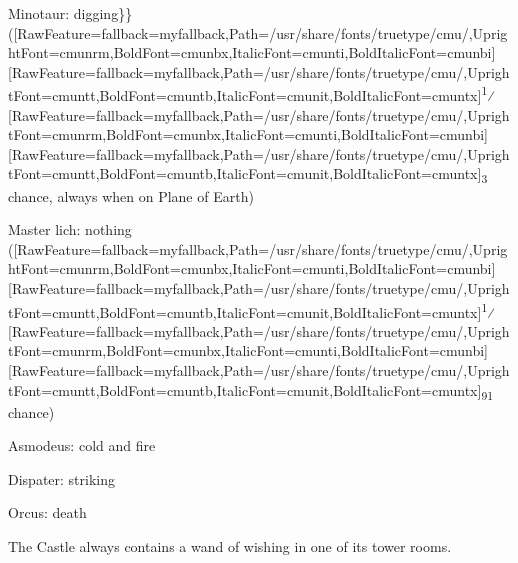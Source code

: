 \begin{myitemize}
\item{}Minotaur\footnotemark[67]: digging\}\} (\allowbreak{}\setmainfont{cmunrm.ttf}[RawFeature={fallback=myfallback},Path=/usr/share/fonts/truetype/cmu/,UprightFont=cmunrm,BoldFont=cmunbx,ItalicFont=cmunti,BoldItalicFont=cmunbi]\setmonofont{cmunrm.ttf}[RawFeature={fallback=myfallback},Path=/usr/share/fonts/truetype/cmu/,UprightFont=cmuntt,BoldFont=cmuntb,ItalicFont=cmunit,BoldItalicFont=cmuntx]\textsuperscript{1}⁄\allowbreak{}\setmainfont{cmunrm.ttf}[RawFeature={fallback=myfallback},Path=/usr/share/fonts/truetype/cmu/,UprightFont=cmunrm,BoldFont=cmunbx,ItalicFont=cmunti,BoldItalicFont=cmunbi]\setmonofont{cmunrm.ttf}[RawFeature={fallback=myfallback},Path=/usr/share/fonts/truetype/cmu/,UprightFont=cmuntt,BoldFont=cmuntb,ItalicFont=cmunit,BoldItalicFont=cmuntx]\textsubscript{3} chance, always when on Plane of Earth\footnotemark[68])
\item{}Master lich\footnotemark[69]: nothing\footnotemark[70] (\allowbreak{}\setmainfont{cmunrm.ttf}[RawFeature={fallback=myfallback},Path=/usr/share/fonts/truetype/cmu/,UprightFont=cmunrm,BoldFont=cmunbx,ItalicFont=cmunti,BoldItalicFont=cmunbi]\setmonofont{cmunrm.ttf}[RawFeature={fallback=myfallback},Path=/usr/share/fonts/truetype/cmu/,UprightFont=cmuntt,BoldFont=cmuntb,ItalicFont=cmunit,BoldItalicFont=cmuntx]\textsuperscript{1}⁄\allowbreak{}\setmainfont{cmunrm.ttf}[RawFeature={fallback=myfallback},Path=/usr/share/fonts/truetype/cmu/,UprightFont=cmunrm,BoldFont=cmunbx,ItalicFont=cmunti,BoldItalicFont=cmunbi]\setmonofont{cmunrm.ttf}[RawFeature={fallback=myfallback},Path=/usr/share/fonts/truetype/cmu/,UprightFont=cmuntt,BoldFont=cmuntb,ItalicFont=cmunit,BoldItalicFont=cmuntx]\textsubscript{91} chance)
\item{}Asmodeus\footnotemark[71]: cold and fire
\item{}Dispater\footnotemark[72]: striking
\item{}Orcus\footnotemark[73]: death
\end{myitemize}

The Castle\footnotemark[74] always contains a wand of wishing\footnotemark[75] in one of its tower rooms.



